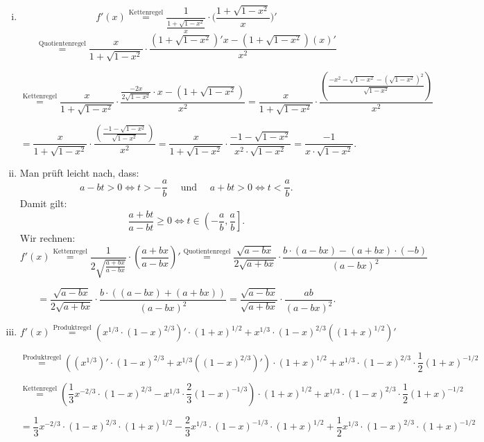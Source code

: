 \documentclass[a4paper, 20]{exam}
\begin{document}
\begin{solution}
\begin{enumerate}[i.)]
\item
$$f'(x) \stackrel{\text{Kettenregel}}{=} \frac{1}{\frac{1 + \sqrt{1-x^2}}{x}} \cdot \bigg(\frac{1 + \sqrt{1-x^2}}{x}\bigg)'$$
$$\stackrel{\text{Quotientenregel}}{=} \frac{x}{1 + \sqrt{1-x^2}} \cdot \frac{(1 + \sqrt{1-x^2})'x - (1 + \sqrt{1-x^2})(x)'}{x^2}$$

$$\stackrel{\text{Kettenregel}}{=} \frac{x}{1 + \sqrt{1-x^2}} \cdot \frac{\frac{-2x}{2 \sqrt{1-x^2}}\cdot x - (1 + \sqrt{1-x^2})}{x^2}
= \frac{x}{1 + \sqrt{1-x^2}} \cdot \frac{\left(\frac{-x^2 - \sqrt{1-x^2} - (\sqrt{1-x^2})^2}{ \sqrt{1-x^2}}\right)}{x^2}$$

$$ =  \frac{x}{1 + \sqrt{1-x^2}} \cdot \frac{\left(\frac{-1 - \sqrt{1-x^2}}{ \sqrt{1-x^2}}\right)}{x^2}
= \frac{x}{1 + \sqrt{1-x^2}} \cdot \frac{-1 - \sqrt{1-x^2}}{x^2 \cdot \sqrt{1-x^2} }
= \frac{-1}{x\cdot \sqrt{1-x^2} }.$$
\item
Man pr\"uft leicht nach, dass: 
$$a-b t >0 \Longleftrightarrow t > -\frac{a}{b} \quad \text{ und }
\quad a+b t >0 \Longleftrightarrow t < \frac{a}{b}.$$
Damit gilt:
$$\frac{a+b t}{a-b t} \geq 0 \Longleftrightarrow t\in \left( -\frac{a}{b}, \frac{a}{b} \right].$$
Wir rechnen:
$$ f'(x)  \stackrel{\text{Kettenregel}}{=} \frac{1}{2\sqrt{\frac{a+bx}{a-bx}}} \cdot \left( \frac{a+bx}{a-bx} \right)' 
\stackrel{\text{Quotientenregel}}{=} \frac{\sqrt{a-bx}}{2\sqrt{a+bx}} \cdot \frac{b\cdot (a-bx) - (a+bx)\cdot(-b)}{(a-bx)^2}$$

$$= \frac{\sqrt{a-bx}}{2\sqrt{a+bx}} \cdot \frac{b\cdot ((a-bx) + (a+bx))}{(a-bx)^2}
= \frac{\sqrt{a-bx}}{\sqrt{a+bx}} \cdot \frac{ab}{(a-bx)^2}.$$
\item
$$f'(x) \stackrel{\text{Produktregel}}{=} \left( x^{1/3} \cdot (1-x)^{2/3} \right)'\cdot (1+x)^{1/2} + x^{1/3} \cdot (1-x)^{2/3} \left( (1+x)^{1/2}\right)'$$

$$\stackrel{\text{Produktregel}}{=} \left( \left(x^{1/3} \right)' \cdot (1-x)^{2/3} + x^{1/3} \left( (1-x)^{2/3} \right)' \right)\cdot (1+x)^{1/2} + x^{1/3} \cdot (1-x)^{2/3} \cdot \frac{1}{2} (1+x)^{-1/2}$$

$$ \stackrel{\text{Kettenregel}}{=} \left( \frac{1}{3} x^{-2/3} \cdot (1-x)^{2/3} - x^{1/3} \cdot \frac{2}{3}(1-x)^{-1/3} \right) \cdot (1+x)^{1/2} + x^{1/3} \cdot (1-x)^{2/3} \cdot \frac{1}{2} (1+x)^{-1/2}$$

$$=\frac{1}{3}x^{-2/3}\cdot (1-x)^{2/3}\cdot (1+x)^{1/2} -\frac{2}{3}x^{1/3}\cdot (1-x)^{-1/3}\cdot (1+x)^{1/2}+ \frac{1}{2} x^{1/3} \cdot (1-x)^{2/3} \cdot (1+x)^{-1/2}$$


\end{enumerate}
\end{solution}
\end{document}

